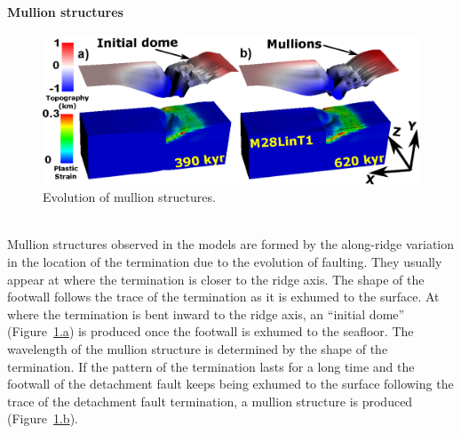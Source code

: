 \paragraph{Mullion structures}

\begin{figure}[h]
  \centering
    \includegraphics[width=1.0\textwidth]{./Figures/fig_Results_3_2_6_mullion_evolution.eps}
  \caption{Evolution of mullion structures.}
 \label{fig_Results_3_2_6_mullion_evolution}
\end{figure}
~\\
Mullion structures observed in the models are formed by the along-ridge variation in the location of the termination due to the evolution of faulting. They usually appear at where the termination is closer to the ridge axis. The shape of the footwall follows the trace of the termination as it is exhumed to the surface. At where the termination is bent inward to the ridge axis, an ``initial dome'' (Figure~\hyperref[fig_Results_3_2_6_mullion_evolution]{\ref{fig_Results_3_2_6_mullion_evolution}.a}) is produced once the footwall is exhumed to the seafloor. The wavelength of the mullion structure is determined by the shape of the termination. If the pattern of the termination lasts for a long time and the footwall of the detachment fault keeps being exhumed to the surface following the trace of the detachment fault termination, a mullion structure is produced (Figure~\hyperref[fig_Results_3_2_6_mullion_evolution]{\ref{fig_Results_3_2_6_mullion_evolution}.b}). 

